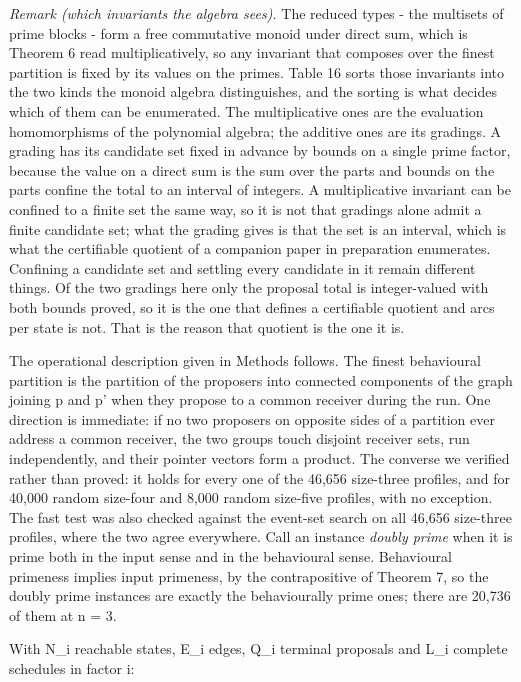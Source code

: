 \documentclass[
  11pt,
]{article}
\begin{document}
\emph{Remark (which invariants the algebra sees).} The reduced types -
the multisets of prime blocks - form a free commutative monoid under
direct sum, which is Theorem 6 read multiplicatively, so any invariant
that composes over the finest partition is fixed by its values on the
primes. Table 16 sorts those invariants into the two kinds the monoid
algebra distinguishes, and the sorting is what decides which of them can
be enumerated. The multiplicative ones are the evaluation homomorphisms
of the polynomial algebra; the additive ones are its gradings. A grading
has its candidate set fixed in advance by bounds on a single prime
factor, because the value on a direct sum is the sum over the parts and
bounds on the parts confine the total to an interval of integers. A
multiplicative invariant can be confined to a finite set the same way,
so it is not that gradings alone admit a finite candidate set; what the
grading gives is that the set is an interval, which is what the
certifiable quotient of a companion paper in preparation enumerates.
Confining a candidate set and settling every candidate in it remain
different things. Of the two gradings here only the proposal total is
integer-valued with both bounds proved, so it is the one that defines a
certifiable quotient and arcs per state is not. That is the reason that
quotient is the one it is.

The operational description given in Methods follows. The finest
behavioural partition is the partition of the proposers into connected
components of the graph joining p and p' when they propose to a common
receiver during the run. One direction is immediate: if no two proposers
on opposite sides of a partition ever address a common receiver, the two
groups touch disjoint receiver sets, run independently, and their
pointer vectors form a product. The converse we verified rather than
proved: it holds for every one of the 46,656 size-three profiles, and
for 40,000 random size-four and 8,000 random size-five profiles, with no
exception. The fast test was also checked against the event-set search
on all 46,656 size-three profiles, where the two agree everywhere. Call
an instance \emph{doubly prime} when it is prime both in the input sense
and in the behavioural sense. Behavioural primeness implies input
primeness, by the contrapositive of Theorem 7, so the doubly prime
instances are exactly the behaviourally prime ones; there are 20,736 of
them at n = 3.

With N\_i reachable states, E\_i edges, Q\_i terminal proposals and L\_i
complete schedules in factor i:
\end{document}
